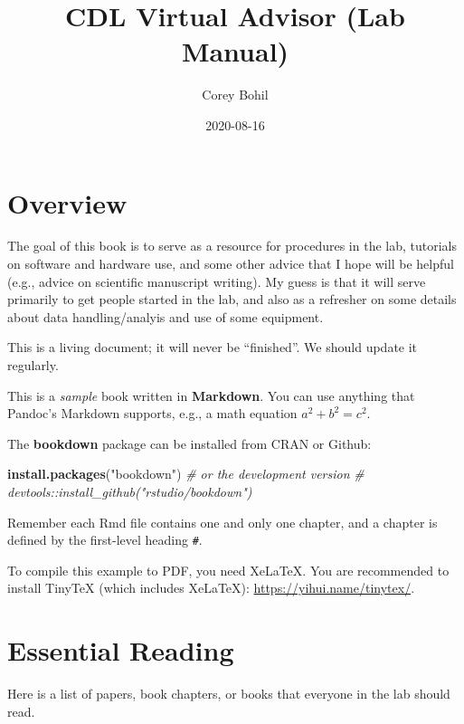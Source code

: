 \documentclass[
]{book}
\title{CDL Virtual Advisor (Lab Manual)}
\author{Corey Bohil}
\date{2020-08-16}
\newenvironment{Shaded}{\begin{snugshade}}{\end{snugshade}}
\newcommand{\CommentTok}[1]{\textcolor[rgb]{0.56,0.35,0.01}{\textit{#1}}}
\newcommand{\KeywordTok}[1]{\textcolor[rgb]{0.13,0.29,0.53}{\textbf{#1}}}
\newcommand{\NormalTok}[1]{#1}
\newcommand{\StringTok}[1]{\textcolor[rgb]{0.31,0.60,0.02}{#1}}
\begin{document}
\maketitle

{
\setcounter{tocdepth}{1}
\tableofcontents
}
\hypertarget{overview}{%
\chapter{Overview}\label{overview}}

The goal of this book is to serve as a resource for procedures in the lab, tutorials on software and hardware use, and some other advice that I hope will be helpful (e.g., advice on scientific manuscript writing). My guess is that it will serve primarily to get people started in the lab, and also as a refresher on some details about data handling/analyis and use of some equipment.

This is a living document; it will never be ``finished''. We should update it regularly.

This is a \emph{sample} book written in \textbf{Markdown}. You can use anything that Pandoc's Markdown supports, e.g., a math equation \(a^2 + b^2 = c^2\).

The \textbf{bookdown} package can be installed from CRAN or Github:

\begin{Shaded}
\begin{Highlighting}[]
\KeywordTok{install.packages}\NormalTok{(}\StringTok{"bookdown"}\NormalTok{)}
\CommentTok{# or the development version}
\CommentTok{# devtools::install_github("rstudio/bookdown")}
\end{Highlighting}
\end{Shaded}

Remember each Rmd file contains one and only one chapter, and a chapter is defined by the first-level heading \texttt{\#}.

To compile this example to PDF, you need XeLaTeX. You are recommended to install TinyTeX (which includes XeLaTeX): \url{https://yihui.name/tinytex/}.

\hypertarget{essential-reading}{%
\chapter{Essential Reading}\label{essential-reading}}

Here is a list of papers, book chapters, or books that everyone in the lab should read.
\end{document}
